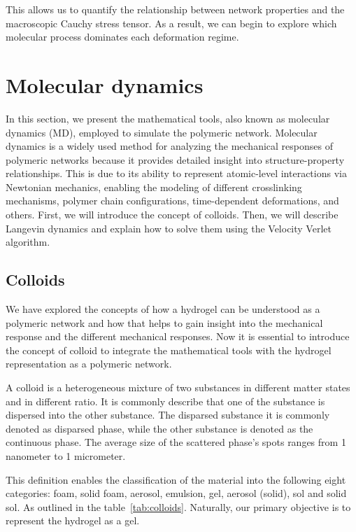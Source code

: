 This allows us to quantify the relationship between network properties and the macroscopic Cauchy stress tensor. 
As a result, we can begin to explore which molecular process dominates each deformation regime.

\section{Molecular dynamics}

In this section, we present the mathematical tools, also known as molecular dynamics (MD), employed to simulate the polymeric network.
Molecular dynamics is a widely used method for analyzing the mechanical responses of polymeric networks because it provides detailed insight into structure-property relationships.
This is due to its ability to represent atomic-level interactions via Newtonian mechanics, enabling the modeling of different crosslinking mechanisms, polymer chain configurations, time-dependent deformations, and others.
First, we will introduce the concept of colloids. 
Then, we will describe Langevin dynamics and explain how to solve them using the Velocity Verlet algorithm.

\subsection{Colloids}

We have explored the concepts of how a hydrogel can be understood as a polymeric network and how that helps to gain insight into the mechanical response and the different mechanical responses.
Now it is essential to introduce the concept of colloid to integrate the mathematical tools with the hydrogel representation as a polymeric network.

A colloid is a heterogeneous mixture of two substances in different matter states and in different ratio\citep{castaneda-priegoColloidalSoftMatter2021}.
It is commonly describe that one of the substance is dispersed into the other substance.
The disparsed substance it is commonly denoted as disparsed phase, while the other substance is denoted as the continuous phase.
The average size of the scattered phase's spots ranges from 1 nanometer to 1 micrometer.

This definition enables the classification of the material into the following eight categories:
foam, solid foam,
aerosol, emulsion, gel,
aerosol (solid), sol and solid sol.
As outlined in the table~\ref{tab:colloids}.
Naturally, our primary objective is to represent the hydrogel as a gel.

